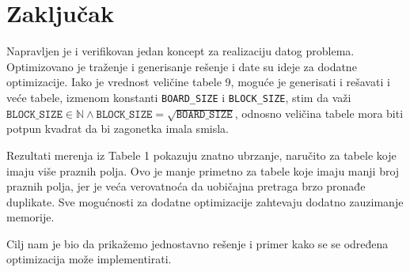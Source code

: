\documentclass[a4paper]{article}
\begin{document}
    \section{Zaključak}
    Napravljen je i verifikovan jedan koncept za realizaciju datog problema. Optimizovano je traženje i generisanje rešenje i date su ideje za 
    dodatne optimizacije. Iako je vrednost veličine tabele 9, moguće je generisati i rešavati i veće tabele, izmenom konstanti \texttt{BOARD\_SIZE} i \texttt{BLOCK\_SIZE}, stim
    da važi $\texttt{BLOCK\_SIZE} \in \mathbb{N} \land \texttt{BLOCK\_SIZE} = \sqrt{\texttt{BOARD\_SIZE}}$, odnosno veličina tabele mora biti potpun kvadrat da bi zagonetka imala smisla.
    \par Rezultati merenja iz Tabele 1 pokazuju znatno ubrzanje, naručito za tabele koje imaju više praznih polja. Ovo je manje primetno za tabele koje imaju 
    manji broj praznih polja, jer je veća verovatnoća da uobičajna pretraga brzo pronađe duplikate. Sve mogućnosti za dodatne optimizacije zahtevaju dodatno zauzimanje memorije. 
    \par Cilj nam je bio da prikažemo jednostavno rešenje i primer kako se 
    se određena optimizacija može implementirati.
    \newpage
\end{document}
